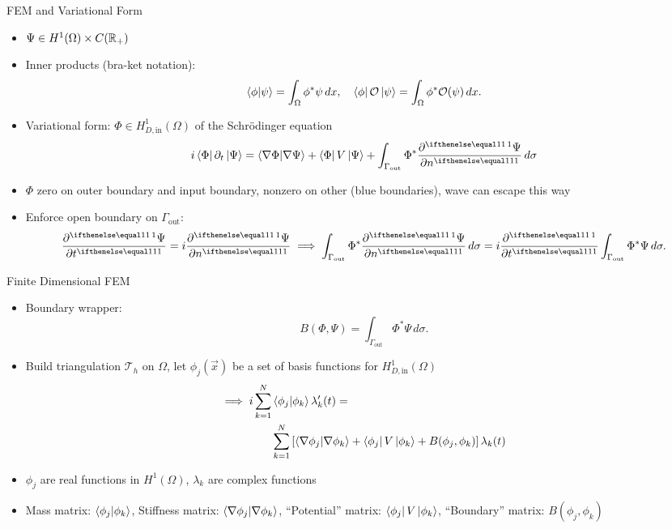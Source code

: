 \documentclass{beamer}
\begin{document}
\begin{frame}{FEM and Variational Form}
  \begin{itemize}
	\item $\Psi \in H^1(\Omega) \times C(\mathbb{R}_+)$
	\item Inner products (bra-ket notation):
			\[
					\bra{\phi}\ket{\psi} = \int_\Omega 
					\phi^* \psi \, dx, \quad 
					\bra{\phi} \mathcal O \ket{\psi} = 
					\int_\Omega \phi^* \mathcal O(\psi) \, dx
			.\] 
	\item Variational form: $\Phi \in H^1_{D, \mathrm{in}}(\Omega)$
			of the Schr\"odinger equation
			\[
			i \bra{\Phi} \partial_t \ket{\Psi} = 
			\bra{\nabla \Phi} \ket{\nabla \Psi} + 
			\bra{\Phi} V \ket{\Psi} + 
			\int_{\Gamma_\mathrm{out}} \Phi^* \pder{\Psi}{n} \, d\sigma
			\] 
	\item $\Phi$ zero on outer boundary and input boundary, 
			nonzero on other (blue boundaries), wave can escape this way
	\item Enforce open boundary on $\Gamma_\mathrm{out}$:
			\[
					\pder{\Psi}{t} = i \pder{\Psi}{n} \implies 
					\int_{\Gamma_\mathrm{out}} \Phi^* \pder{\Psi}{n} \, d\sigma
					= i \pder{}{t} \int_{\Gamma_\mathrm{out}} 
					\Phi^* \Psi \, d\sigma
			.\] 

\end{itemize}
\end{frame}

\begin{frame}{Finite Dimensional FEM}
\begin{itemize} 
		\item Boundary wrapper:
				\[
						B(\Phi, \Psi) = \int_{\Gamma_\mathrm{out}}
						\Phi^* \Psi \, d\sigma
				.\] 
		\item Build triangulation $\mathcal T_h$ on $\Omega$, let 
				$\phi_j(\vec x)$ be a set of basis functions for 
				$H^1_{D, \mathrm{in}}(\Omega)$
			\[\begin{split}
					\implies i \sum_{k=1}^N 
					& \bra{\phi_j} \ket{\phi_k} \lambda_k'(t) = \\
					& \sum_{k=1}^N \left[
					\bra{\nabla \phi_j} \ket{\nabla \phi_k}
	       			+ \bra{\phi_j} V \ket{\phi_k} + 
					B(\phi_j, \phi_k)
			\right] 
					\lambda_k(t)
			\end{split}\] 
	\item $\phi_j$ are real functions in $H^1(\Omega)$,
			$\lambda_k$ are complex functions
	\item Mass matrix: 
			$\bra{\phi_j}\ket{\phi_k}$, 
			Stiffness matrix:
			$\bra{\nabla \phi_j}\ket{\nabla \phi_k}$,
			``Potential'' matrix:
			$\bra{\phi_j} V \ket{\phi_k}$, 
			``Boundary'' matrix:
			$B(\phi_j, \phi_k)$
\end{itemize}
\end{frame}
\end{document}
